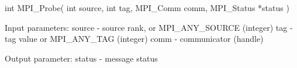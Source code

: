 int MPI_Probe( int source, int tag, MPI_Comm comm,
    MPI_Status *status )

Input parameters:
source - source rank, or MPI_ANY_SOURCE (integer)
tag    - tag value or MPI_ANY_TAG (integer)
comm   - communicator (handle)
       
Output parameter:
status - message status
